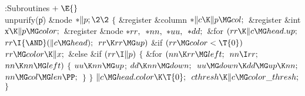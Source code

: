 \Y\B\4:Subroutines\X${}\mathrel+\E{}$\6
\\{unpurify}(\|p)\1\1\6
\&{node} ${}{*}\|p;\2\2{}$\6
${}\{{}$\5
\1\&{register} \&{column} ${}{*}\|c\K\|p\MG\\{col};{}$\6
\&{register} \&{int} \|x${}\K\|p\MG\\{color};{}$\6
\&{register} \&{node} ${}{*}\\{rr},{}$ ${}{*}\\{nn},{}$ ${}{*}\\{uu},{}$ ${}{*}%
\\{dd};{}$\7
\&{for} ${}(\\{rr}\K\|c\MG\\{head}.\\{up};{}$ ${}\\{rr}\I{\AND}(\|c\MG%
\\{head});{}$ ${}\\{rr}\K\\{rr}\MG\\{up}){}$\1\6
\&{if} ${}(\\{rr}\MG\\{color}<\T{0}){}$\1\5
${}\\{rr}\MG\\{color}\K\|x;{}$\2\6
\&{else} \&{if} ${}(\\{rr}\I\|p){}$\5
${}\{{}$\1\6
\&{for} ${}(\\{nn}\K\\{rr}\MG\\{left};{}$ ${}\\{nn}\I\\{rr};{}$ ${}\\{nn}\K%
\\{nn}\MG\\{left}){}$\5
${}\{{}$\1\6
${}\\{uu}\K\\{nn}\MG\\{up}{}$;\5
${}\\{dd}\K\\{nn}\MG\\{down};{}$\6
${}\\{uu}\MG\\{down}\K\\{dd}\MG\\{up}\K\\{nn};{}$\6
${}\\{nn}\MG\\{col}\MG\\{len}\PP;{}$\6
\4${}\}{}$\2\6
\4${}\}{}$\2\2\6
${}\|c\MG\\{head}.\\{color}\K\T{0};{}$\6
${}\\{cthresh}\K\|c\MG\\{color\_thresh};{}$\6
\4${}\}{}$\2\par
\fi

